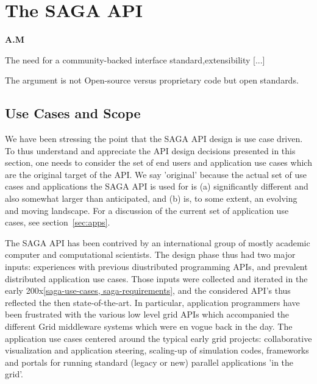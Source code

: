 
\section{The SAGA API} \textbf{A.M}

 The need for a community-backed interface standard,extensibility
 [...]


 The argument is not Open-source versus proprietary code but open
 standards. 



 \subsection{Use Cases and Scope}

  We have been stressing the point that the SAGA API design is use
  case driven.  To thus understand and appreciate the API design
  decisions presented in this section, one needs to consider the set
  of end users and application use cases which are the original
  target of the API.  We say 'original' because the actual set of use
  cases and applications the SAGA API is used for is (a) significantly
  different and also somewhat larger than anticipated, and (b) is, to
  some extent, an evolving and moving landscape.  For a discussion of
  the current set of application use cases, see
  section~\ref{sec:apps}.

  The SAGA API has been contrived by an international group of mostly
  academic computer and computational scientists.  The design phase
  thus had two major inputs: experiences with previous diustributed
  programming APIs, and prevalent distributed application use cases.
  Those inputs were collected and iterated in the early
  200x\ref{saga-use-cases, saga-requirements}, and the considered
  API's thus reflected the then state-of-the-art.  In particular,
  application programmers have been frustrated with the various low
  level grid APIs which accompanied the different Grid middleware
  systems which were en vogue back in the day.  The application use
  cases centered around the typical early grid projects: collaborative
  visualization and application steering, scaling-up of simulation
  codes, frameworks and portals for running standard (legacy or new)
  parallel applications 'in the grid'.

